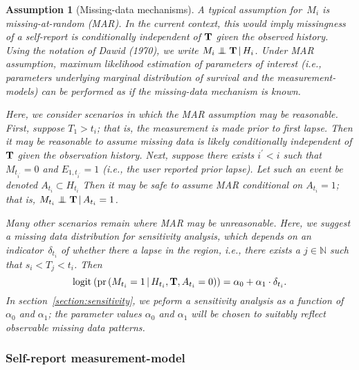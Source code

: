 \documentclass[11pt]{amsart}
\def\pr{\mathop{\text{pr}}\nolimits}
\def\pr{\mathop{\text{pr}}\nolimits}
\def\logit{\mathop{\text{logit}_{}}\nolimits}
\def\logit{\mathop{\text{logit}_{}}\nolimits}
\newtheorem{assumption}[thm]{Assumption}
\def\indep{\mathrel{\rlap{$\perp$}\kern1.6pt\mathord{\perp}}}
\def\given{\, | \,}
\def\Nat{\mathbb{N}}
\def\bfT{{\bf T}}
\begin{document}
\begin{assumption}[Missing-data mechanisms] \normalfont
A typical assumption for~$M_i$ is \emph{missing-at-random} (MAR). In
the current context, this would imply missingness of a self-report is
conditionally independent of $\bfT$ given the observed history. Using
the notation of Dawid (1970), we write $M_{i} \indep \bfT \given
H_{i}$. Under MAR assumption, maximum likelihood estimation of
parameters of interest (i.e., parameters underlying marginal
distribution of survival and the measurement-models) can be performed
as if the missing-data mechanism is known.

Here, we consider scenarios in which the MAR assumption may be
reasonable.
First, suppose $T_1 > t_i$; that is, the measurement is made
prior to first lapse. Then it may be reasonable to assume missing data
is likely conditionally independent of $\bfT$ given the observation
history.  Next, suppose there exists $i^\prime < i$ such that
$M_{t_{i^\prime}} = 0$ and $E_{1,t_{i^\prime}} = 1$ (i.e., the user
reported prior lapse). Let such an event be denoted $A_{t_i} \subset
H_{t_i}$ Then it may be safe to assume MAR conditional on $A_{t_i} =
1$; that is, $M_{t_i} \indep \bfT \given A_{t_i} = 1$.

Many other scenarios remain where MAR may be unreasonable.  Here, we
suggest a missing data distribution for sensitivity analysis, which
depends on an indicator~$\delta_{t_i}$ of whether there a lapse in the
region, i.e., there exists a $j \in \Nat$ such that $s_i < T_j <
t_i$. Then
\[
\logit \left( \pr \left( M_{t_i} = 1 \given H_{t_i}, \bfT, A_{t_i} = 0
  \right) \right) = \alpha_0 + \alpha_1 \cdot \delta_{t_i}.
\]
In section~\ref{section:sensitivity}, we peform a sensitivity analysis
as a function of $\alpha_0$ and $\alpha_1$; the parameter values
$\alpha_0$ and $\alpha_1$ will be chosen to suitably reflect
observable missing data patterns.
\end{assumption}

\subsubsection{Self-report measurement-model}
\end{document}

